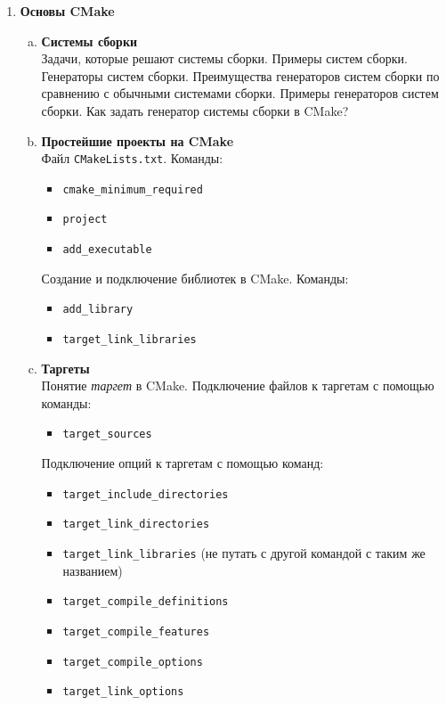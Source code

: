 \documentclass{article}
\begin{document}
\begin{enumerate}
\begin{enumerate}[a.]
\end{enumerate}


\newpage
\item \textbf{Основы CMake}
\begin{enumerate}[a.]
\item \textbf{Системы сборки}\\
Задачи, которые решают системы сборки. Примеры систем сборки. Генераторы систем сборки.
Преимущества генераторов систем сборки по сравнению с обычными системами сборки. Примеры генераторов систем сборки. Как задать генератор системы сборки в CMake?

\item \textbf{Простейшие проекты на CMake}\\
Файл \texttt{CMakeLists.txt}. Команды:
\begin{itemize}
\item \texttt{cmake\_minimum\_required}
\item \texttt{project}
\item \texttt{add\_executable}
\end{itemize}
Создание и подключение библиотек в CMake. Команды:
\begin{itemize}
\item \texttt{add\_library}
\item \texttt{target\_link\_libraries}
\end{itemize}


\item \textbf{Таргеты}\\
Понятие \textit{таргет} в CMake. 
Подключение файлов к таргетам с помощью команды:
\begin{itemize}
\item \texttt{target\_sources}
\end{itemize}

Подключение опций к таргетам с помощью команд:
\begin{itemize}
\item \texttt{target\_include\_directories}
\item \texttt{target\_link\_directories}
\item \texttt{target\_link\_libraries} (не путать с другой командой с таким же названием)
\item \texttt{target\_compile\_definitions}
\item \texttt{target\_compile\_features}
\item \texttt{target\_compile\_options}
\item \texttt{target\_link\_options}
\end{itemize}


\end{enumerate}
\end{enumerate}
\end{document}
